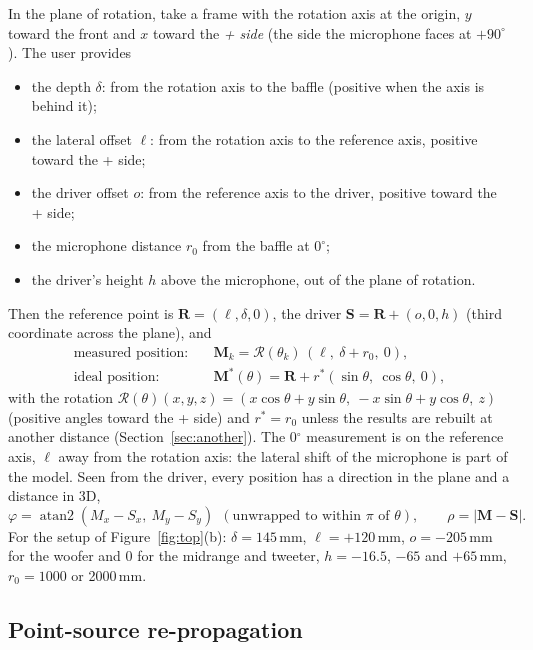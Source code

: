 \documentclass[11pt,a4paper]{article}
\newcommand{\vect}[1]{\mathbf{#1}}
\begin{document}
In the plane of rotation, take a frame with the rotation axis at the origin, $y$ toward the front
and $x$ toward the \emph{+ side} (the side the microphone faces at $+90^\circ$). The user provides
\begin{itemize}
  \item the depth $\delta$: from the rotation axis to the baffle (positive when the axis is behind it);
  \item the lateral offset $\ell$: from the rotation axis to the reference axis, positive toward the
  + side;
  \item the driver offset $o$: from the reference axis to the driver, positive toward the + side;
  \item the microphone distance $r_0$ from the baffle at $0^\circ$;
  \item the driver's height $h$ above the microphone, out of the plane of rotation.
\end{itemize}
Then the reference point is $\vect R=(\ell,\delta,0)$, the driver $\vect S=\vect R+(o,0,h)$ (third
coordinate across the plane), and
\begin{align}
  \text{measured position:}\quad &\vect M_k=\mathcal R(\theta_k)\,(\ell,\ \delta+r_0,\ 0),\\
  \text{ideal position:}\quad &\vect M^*(\theta)=\vect R+r^*(\sin\theta,\ \cos\theta,\ 0),
\end{align}
with the rotation $\mathcal R(\theta)(x,y,z)=(x\cos\theta+y\sin\theta,\ -x\sin\theta+y\cos\theta,\ z)$
(positive angles toward the + side) and $r^*=r_0$ unless the results are rebuilt at another distance
(Section~\ref{sec:another}). The 0$^\circ$ measurement is on the reference axis, $\ell$ away from the
rotation axis: the lateral shift of the microphone is part of the model. Seen from the driver, every
position has a direction in the plane and a distance in 3D,
\begin{equation}
  \varphi=\operatorname{atan2}(M_x-S_x,\ M_y-S_y)\ \ (\text{unwrapped to within }\pi\text{ of }\theta),\qquad
  \rho=|\vect M-\vect S|.
\end{equation}
For the setup of Figure~\ref{fig:top}(b): $\delta=145$\,mm, $\ell=+120$\,mm, $o=-205$\,mm for the
woofer and 0 for the midrange and tweeter, $h=-16.5$, $-65$ and $+65$\,mm, $r_0=1000$ or 2000\,mm.

\subsection{Point-source re-propagation}
\end{document}
